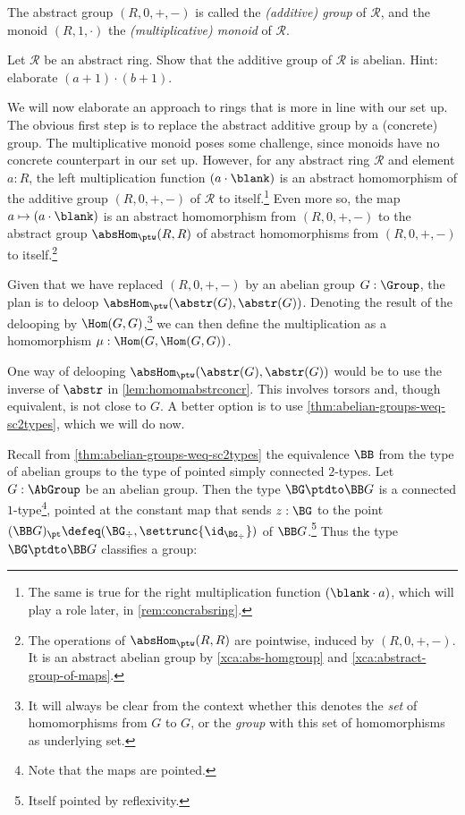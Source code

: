 The abstract group $(R,0,+,-)$ is called the \emph{(additive) group}
of $\mathscr R$, and the monoid $(R,1,\cdot)$ the 
\emph{(multiplicative) monoid} of $\mathscr R$.

\begin{xca}\label{xca:ring-group-abelian}
Let $\mathscr R$ be an abstract ring. Show that the additive group 
of $\mathscr R$ is abelian. Hint: elaborate $(a+1)\cdot(b+1)$.
\end{xca}

We will now elaborate an approach to rings that is more in line
with our set up. The obvious first step is to replace the abstract
additive group by a (concrete) group. The multiplicative monoid
poses some challenge, since monoids have no concrete counterpart in our set up.
However, for any abstract ring $\mathscr R$ and element $a:R$,
the left multiplication function $(a\cdot\blank)$ is an abstract homomorphism 
of the additive group $(R,0,+,-)$ of $\mathscr R$ to itself.\footnote{%
The same is true for the right multiplication function $(\blank\cdot a)$,
which will play a role later, in \cref{rem:concrabsring}.}
Even more so, the map $a\mapsto(a\cdot\blank)$ is an abstract homomorphism
from $(R,0,+,-)$ to the abstract group $\absHom_{\ptw}(R,R)$
of abstract homomorphisms from $(R,0,+,-)$ to itself.\footnote{%
The operations of $\absHom_{\ptw}(R,R)$ are pointwise,
induced by $(R,0,+,-)$. It is an abstract abelian group by
\cref{xca:abs-homgroup} and \cref{xca:abstract-group-of-maps}.}

Given that we have replaced $(R,0,+,-)$ by an abelian group $G:\Group$,
the plan is to deloop $\absHom_{\ptw}(\abstr(G),\abstr(G))$. 
Denoting the result of the delooping by $\Hom(G,G)$,\footnote{%
It will always be clear from the context whether this denotes
the \emph{set} of homomorphisms from $G$ to $G$, or the \emph{group}
with this set of homomorphisms as underlying set.}
we can then define the multiplication as a homomorphism
$\mu: \Hom(G,\Hom(G,G))$.

One way of delooping $\absHom_{\ptw}(\abstr(G),\abstr(G))$ would be
to use the inverse of $\abstr$ in \cref{lem:homomabstrconcr}.
This involves torsors and, though equivalent, is not close to $G$.  
A better option is to use \cref{thm:abelian-groups-weq-sc2types},
which we will do now.

Recall from \cref{thm:abelian-groups-weq-sc2types} the equivalence
$\BB$ from the type of abelian groups to the type of pointed
simply connected $2$-types. Let $G:\AbGroup$ be an abelian group.
Then the type $\BG\ptdto\BB G$ is a connected $1$-type\footnote{%
Note that the maps are pointed.}, pointed at the constant map that sends
$z:\BG$ to the point $(\BB G)_\pt\defeq (\BG_\div,\settrunc{\id_{\BG_\div}})$ 
of $\BB G$.\footnote{Itself pointed by reflexivity.}
Thus the type $\BG\ptdto\BB G$ classifies a group: 

